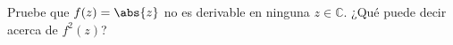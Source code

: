 \documentclass[../main.tex]{subfiles}
\begin{document}
\begin{problema}
    Pruebe que \(f(z) = \abs{z}\) no es derivable en ninguna \(z\in \mathbb{C}\).
    ¿Qué puede decir acerca de \(f^{2}(z)\)?
\end{problema}
\end{document}
